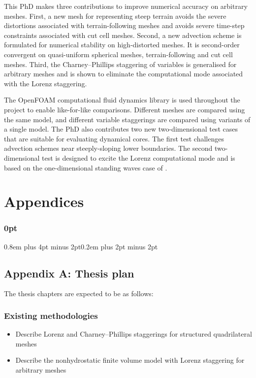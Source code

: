 \documentclass[a4paper,11pt]{article}
\begin{document}
This PhD makes three contributions to improve numerical accuracy on arbitrary meshes.  First, a new mesh for representing steep terrain avoids the severe distortions associated with terrain-following meshes and avoids severe time-step constraints associated with cut cell meshes.  Second, a new advection scheme is formulated for numerical stability on high-distorted meshes.  It is second-order convergent on quasi-uniform spherical meshes, terrain-following and cut cell meshes.
Third, the Charney--Phillips staggering of variables is generalised for arbitrary meshes and is shown to eliminate the computational mode associated with the Lorenz staggering.

The OpenFOAM computational fluid dynamics library is used throughout the project to enable like-for-like comparisons.  Different meshes are compared using the same model, and different variable staggerings are compared using variants of a single model.
The PhD also contributes two new two-dimensional test cases that are suitable for evaluating dynamical cores.  The first test challenges advection schemes near steeply-sloping lower boundaries.  The second two-dimensional test is designed to excite the Lorenz computational mode and is based on the one-dimensional standing waves case of \citet{arakawa-konor1996}.

                                                 


\newpage

\section*{Appendices}

\titlespacing\subsubsection{0pt}{0.8em plus 4pt minus 2pt}{0.2em plus 2pt minus 2pt}

\subsection*{Appendix A: Thesis plan}
The thesis chapters are expected to be as follows:

\subsubsection*{Existing methodologies}
\begin{itemize}[itemsep=0.1em]
	\item Describe Lorenz and Charney--Phillips staggerings for structured quadrilateral meshes
	\item Describe the nonhydrostatic finite volume model with Lorenz staggering for arbitrary meshes \citep{weller-shahrokhi2014}
\end{itemize}
\end{document}
